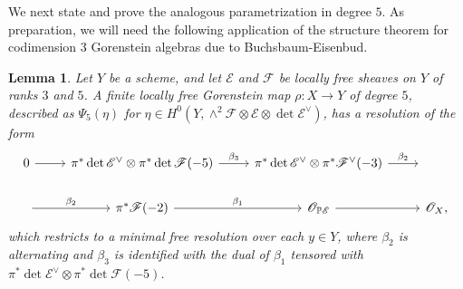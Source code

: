 \documentclass[12 pt]{amsart}
\theoremstyle{plain}
\newtheorem{lemma}[theorem]{Lemma}
\theoremstyle{definition}
\theoremstyle{remark}
\numberwithin{equation}{section}
\newcommand\bp{\mathbb P}
\newcommand\sce{\mathscr E}
\newcommand\scf{\mathscr F}
\newcommand\sco{\mathscr O}
\begin{document}
We next state and prove the analogous parametrization in degree $5$.
As preparation, we will need the following application of the structure theorem
for codimension $3$ Gorenstein algebras due to Buchsbaum-Eisenbud.
\begin{lemma}
	\label{lemma:b-e-resolution}
	Let $Y$ be a scheme, and let $\sce$ and $\scf$ be locally free sheaves
	on $Y$ of ranks $3$ and $5$.
	A finite locally free Gorenstein map $\rho: X \to Y$ of degree
	$5$, described as $\Psi_5(\eta)$ for
	$\eta\in H^0(Y, \wedge^2 \scf \otimes \sce \otimes \det \sce^{\vee})$, 
	has a resolution of the form
	\begin{equation}
		\label{equation:b-e-resolution}
		\begin{tikzcd}
			0 \ar {r} & \pi^* \det \sce^\vee \otimes \pi^*\det
			\scf(-5) \ar {r}{\beta_3} & \pi^* \det \sce^\vee \otimes \pi^* \scf^\vee(-3) \ar
			{r}{\beta_2} & \qquad \\
		\ar{r} {\beta_2} & \pi^* \scf(-2) \ar {r}{\beta_1}
			& \sco_{\bp \sce} \ar{r} & \sco_X,
	\end{tikzcd}\end{equation}
	which restricts to a minimal free resolution over each $y\in Y$,
	where $\beta_2$ is alternating and $\beta_3$ is identified with the dual
	of $\beta_1$ tensored with $\pi^* \det \sce^\vee \otimes \pi^*\det
	\scf(-5)$.
\end{lemma}
\end{document}
